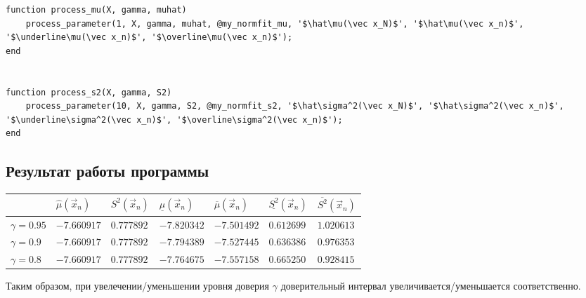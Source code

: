 \documentclass[12pt]{report}
\begin{document}
\begin{lstlisting}
function process_mu(X, gamma, muhat)
	process_parameter(1, X, gamma, muhat, @my_normfit_mu, '$\hat\mu(\vec x_N)$', '$\hat\mu(\vec x_n)$', '$\underline\mu(\vec x_n)$', '$\overline\mu(\vec x_n)$');
end


function process_s2(X, gamma, S2)
	process_parameter(10, X, gamma, S2, @my_normfit_s2, '$\hat\sigma^2(\vec x_N)$', '$\hat\sigma^2(\vec x_n)$', '$\underline\sigma^2(\vec x_n)$', '$\overline\sigma^2(\vec x_n)$');
end
\end{lstlisting}

\subsection*{Результат работы программы}

\begin{table}[h!]
	\centering
\begin{tabular}{l|l|l|l|l|l|l} 
	& $\hat\mu(\vec x_n)$  & $S^2(\vec x_n)$  & $\underline\mu(\vec x_n)$ & $\overline\mu(\vec x_n)$ & $\underline{S^2}(\vec x_n)$  & $\overline{S^2}(\vec x_n)$ \\ \hline
	$\gamma = 0.95$& $-7.660917$  & $0.777892$  & $-7.820342$  & $-7.501492$  & $0.612699$ & $1.020613$ \\ \hline
	$\gamma = 0.9$& $-7.660917$  & $0.777892$ & $-7.794389$ & $-7.527445$ & $0.636386$  & $0.976353$  \\ \hline
	$\gamma = 0.8$& $-7.660917$  & $0.777892$  & $-7.764675$  & $-7.557158$  & $0.665250$  & $0.928415$ \\ 
\end{tabular}	
\end{table}

	Таким образом, при увелечении/уменьшении уровня доверия $\gamma$ доверительный интервал увеличивается/уменьшается соответственно.

\newpage

\captionsetup{justification=centering}
\end{document}
